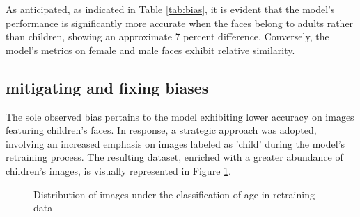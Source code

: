 \documentclass[]{report}
\begin{document}
As anticipated, as indicated in Table \ref{tab:bias}, it is evident that the model's performance is significantly more accurate when the faces belong to adults rather than children, showing an approximate 7 percent difference. Conversely, the model's metrics on female and male faces exhibit relative similarity.

\subsection{mitigating and fixing biases}


The sole observed bias pertains to the model exhibiting lower accuracy on images featuring children's faces. In response, a strategic approach was adopted, involving an increased emphasis on images labeled as 'child' during the model's retraining process. The resulting dataset, enriched with a greater abundance of children's images, is visually represented in Figure \ref{fig:child}.


\begin{figure}
	\centering
	
	\caption{Distribution of images under the classification of age in retraining data}
	\label{fig:child}
\end{figure}
\end{document}
